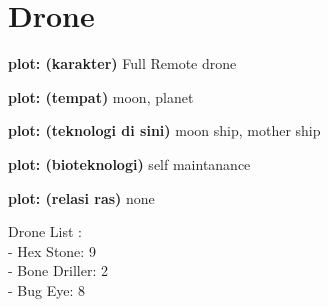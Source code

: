 \chapter{Drone}

\textbf{plot: (karakter)} Full Remote drone

\textbf{plot: (tempat)} moon, planet

\textbf{plot: (teknologi di sini)} moon ship, mother ship

\textbf{plot: (bioteknologi)} self maintanance

\textbf{plot: (relasi ras)} none

Drone List :\\
- Hex Stone: 9\\
- Bone Driller: 2\\
- Bug Eye: 8\\
